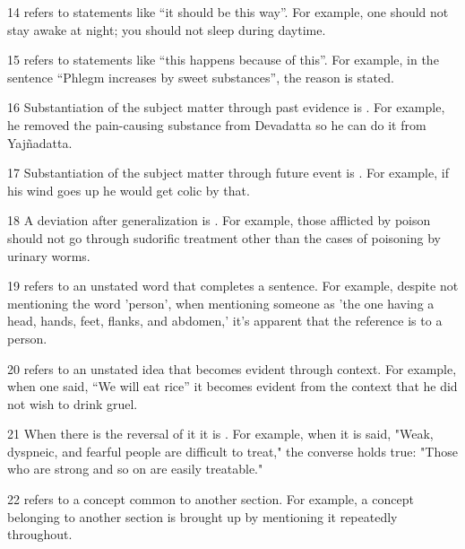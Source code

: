 \begin{translation}
\item [14]  refers to statements like ``it should be this way''. For example, one should not stay awake at night; 
you should not sleep during daytime.  

\item [15]  refers to statements like “this happens because of this”. For example, in the sentence “Phlegm 
increases by sweet substances”, the reason is stated.  

\item [16] Substantiation of the subject matter through past evidence is . 
For example, he removed the pain-causing substance 
from Devadatta so he can do it from Yajñadatta. 

\item [17] Substantiation of the subject matter through future event is 
. For example, if his wind goes up he would get colic by that. 

\item [18] A deviation after generalization is . For example, those afflicted by poison should not go through sudorific treatment other than the cases of poisoning by urinary worms.

\item [19]  refers to an unstated word that completes a sentence. For example, despite not mentioning the word 'person', when mentioning someone as 'the one having a head, hands, feet, flanks, and abdomen,' it's apparent that the reference is to a person. 

\item [20]  refers to an unstated idea that becomes evident through context. For example, when one said, “We will eat rice” it becomes evident from the context that he did not wish to drink gruel. 

\item [21] When there is the reversal of it it is . For example, when it is said, "Weak, dyspneic, and fearful people are difficult to treat," the converse holds true: "Those who are strong and so on are easily treatable." 

\item [22]  refers to a concept common to another section. For example, a concept belonging to another section is brought up by mentioning it repeatedly throughout. 


\end{translation}
